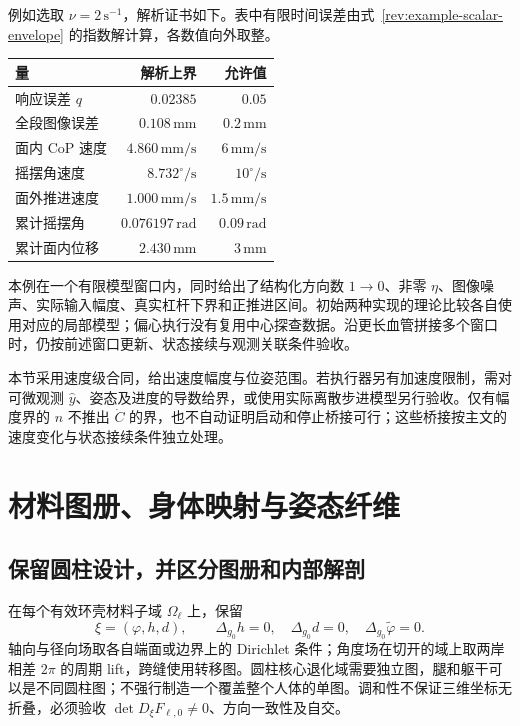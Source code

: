 \documentclass[11pt,a4paper]{article}
\numberwithin{equation}{section}
\theoremstyle{definition}
\begin{document}
例如选取 $\nu=2\,\mathrm{s}^{-1}$，解析证书如下。表中有限时间误差由式~\eqref{rev:example-scalar-envelope} 的指数解计算，各数值向外取整。
\begin{center}
\small
\begin{tabular}{lrr}
\toprule
量 & 解析上界 & 允许值\\
\midrule
响应误差 $q$ & $0.02385$ & $0.05$\\
全段图像误差 & $0.108\,\mathrm{mm}$ & $0.2\,\mathrm{mm}$\\
面内 CoP 速度 & $4.860\,\mathrm{mm/s}$ & $6\,\mathrm{mm/s}$\\
摇摆角速度 & $8.732^\circ/\mathrm{s}$ & $10^\circ/\mathrm{s}$\\
面外推进速度 & $1.000\,\mathrm{mm/s}$ & $1.5\,\mathrm{mm/s}$\\
累计摇摆角 & $0.076197\,\mathrm{rad}$ & $0.09\,\mathrm{rad}$\\
累计面内位移 & $2.430\,\mathrm{mm}$ & $3\,\mathrm{mm}$\\
\bottomrule
\end{tabular}
\end{center}

本例在一个有限模型窗口内，同时给出了结构化方向数 $1\to0$、非零 $\eta$、图像噪声、实际输入幅度、真实杠杆下界和正推进区间。初始两种实现的理论比较各自使用对应的局部模型；偏心执行没有复用中心探查数据。沿更长血管拼接多个窗口时，仍按前述窗口更新、状态接续与观测关联条件验收。

本节采用速度级合同，给出速度幅度与位姿范围。若执行器另有加速度限制，需对可微观测 $\widehat y$、姿态及进度的导数给界，或使用实际离散步进模型另行验收。仅有幅度界的 $n$ 不推出 $\dot C$ 的界，也不自动证明启动和停止桥接可行；这些桥接按主文的速度变化与状态接续条件独立处理。




\section{材料图册、身体映射与姿态纤维}\label{sec:rev:geometry}
\subsection{保留圆柱设计，并区分图册和内部解剖}
在每个有效环壳材料子域 $\Omega_\ell$ 上，保留
\begin{equation}
 \xi=(\varphi,h,d),\qquad
 \Delta_{g_0}h=0,\quad \Delta_{g_0}d=0,\quad
 \Delta_{g_0}\widetilde\varphi=0.
\end{equation}
轴向与径向场取各自端面或边界上的 Dirichlet 条件；角度场在切开的域上取两岸相差 $2\pi$ 的周期 lift，跨缝使用转移图。圆柱核心退化域需要独立图，腿和躯干可以是不同圆柱图；不强行制造一个覆盖整个人体的单图。调和性不保证三维坐标无折叠，必须验收 $\det D_\xi F_{\ell,0}\ne0$、方向一致性及自交。
\end{document}
